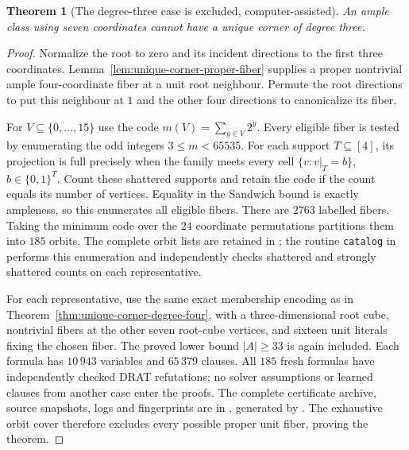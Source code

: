 \documentclass[11pt]{article}
\numberwithin{equation}{section}
\newtheorem{theorem}{Theorem}[section]
\theoremstyle{definition}
\theoremstyle{remark}
\begin{document}
\begin{theorem}[The degree-three case is excluded, computer-assisted]
\label{thm:unique-corner-degree-three}
An ample class using seven coordinates cannot have a unique corner of
degree three.
\end{theorem}
\begin{proof}
Normalize the root to zero and its incident directions to the first
three coordinates. Lemma~\ref{lem:unique-corner-proper-fiber} supplies
a proper nontrivial ample four-coordinate fiber at a unit root neighbour.
Permute the root directions to put this neighbour at $1$ and the other
four directions to canonicalize its fiber.

For $V\subseteq\{0,\ldots,15\}$ use the code
$m(V)=\sum_{y\in V}2^y$. Every eligible fiber is tested by enumerating
the odd integers $3\le m<65535$. For each support $T\subseteq[4]$,
its projection is full precisely when the family meets every cell
$\{v:v|_T=b\}$, $b\in\{0,1\}^T$. Count these shattered supports
and retain the code if the count equals its number of vertices.
Equality in the Sandwich bound is exactly ampleness, so this enumerates
all eligible fibers. There are $2763$ labelled fibers. Taking the
minimum code over the $24$ coordinate permutations partitions them into
$185$ orbits. The complete orbit lists are retained in
; the routine
\texttt{catalog} in 
performs this enumeration and independently checks shattered and strongly
shattered counts on each representative.

For each representative, use the same exact membership encoding as in
Theorem~\ref{thm:unique-corner-degree-four}, with a three-dimensional
root cube, nontrivial fibers at the other seven root-cube vertices, and
sixteen unit literals fixing the chosen fiber. The proved lower bound
$|A|\ge33$ is again included. Each formula has $10\,943$ variables and
$65\,379$ clauses. All $185$ fresh formulas have independently checked
DRAT refutations; no solver assumptions or learned clauses from another
case enter the proofs. The complete certificate archive, source snapshots,
logs and fingerprints are in
, generated by
.
The exhaustive orbit cover therefore excludes every possible proper
unit fiber, proving the theorem.
\end{proof}
\end{document}
